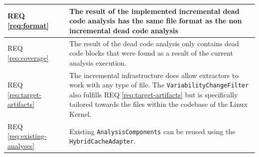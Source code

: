 \documentclass[a4paper]{article}
\newcommand{\cmark}{\ding{51}}%
\begin{document}
\begin{longtable}{ |  L{0.17\textwidth} | C{0.12\textwidth} | L{0.63\textwidth} |}
	REQ \ref{req:format} & \cmark & The result of the implemented incremental dead code analysis has the same file format as the non incremental dead code analysis\\ \hline
	REQ \ref{req:coverage} & \cmark & The result of the dead code analysis only contains dead code blocks that were found as a result of the current analysis execution.\\ \hline
	REQ \ref{req:target-artifacts} & \cmark & The incremental infrastructure does allow extractors to work with any type of file. The \texttt{VariabilityChangeFilter} also fulfills REQ \ref{req:target-artifacts}  but is specifically tailored towards the files within the codebase of the Linux Kernel.\\ \hline
	REQ \ref{req:existing-analyses} & \cmark & Existing \texttt{AnalysisComponents}  can be reused using the \texttt{Hybrid\-Cache\-Adapter}.\\ \hline


	
\end{longtable}
\end{document}
